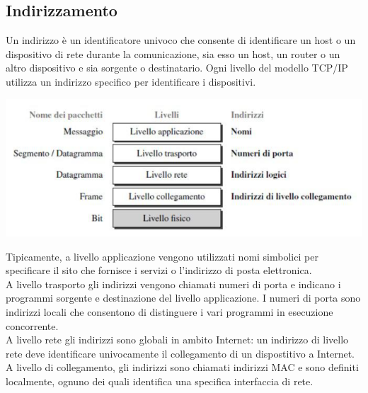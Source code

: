 \documentclass[12pt]{report}
\begin{document}
	\subsection{Indirizzamento}
	Un indirizzo è un identificatore univoco che consente di identificare un host o un dispositivo di rete durante la comunicazione, sia esso un host, un router o un altro dispositivo e sia sorgente o destinatario. Ogni livello del modello TCP/IP utilizza un indirizzo specifico per identificare i dispositivi.
	\begin{center}
		\includegraphics[scale=0.50]{assets/tcp-address.png}
	\end{center}
	Tipicamente, a livello applicazione vengono utilizzati nomi simbolici per specificare il sito che fornisce i servizi o l'indirizzo di posta elettronica.
	\vspace{\baselineskip}\\
	A livello trasporto gli indirizzi vengono chiamati numeri di porta e indicano i programmi sorgente e destinazione del livello applicazione. I numeri di porta sono indirizzi locali che consentono di distinguere i vari programmi in esecuzione concorrente.
	\vspace{\baselineskip}\\
	A livello rete gli indirizzi sono globali in ambito Internet: un indirizzo di livello rete deve identificare univocamente il collegamento di un dispostitivo a Internet.
	\vspace{\baselineskip}\\
	A livello di collegamento, gli indirizzi sono chiamati indirizzi MAC e sono definiti localmente, ognuno dei quali identifica una specifica interfaccia di rete.
\end{document}
